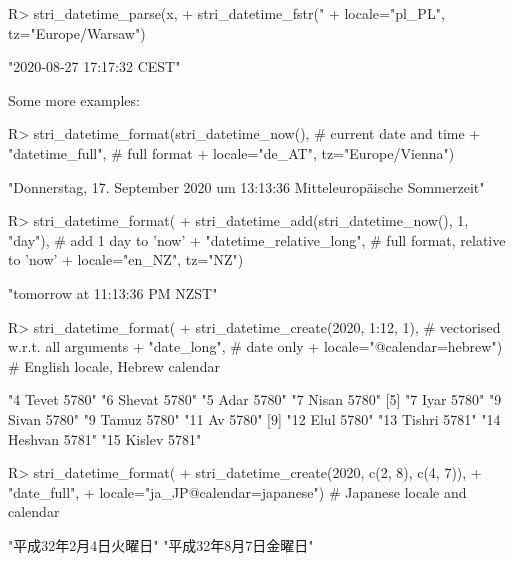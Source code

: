 \documentclass[nojss]{jss}
\begin{document}
\begin{Schunk}
\begin{Sinput}
R> stri_datetime_parse(x,
+    stri_datetime_fstr("%d %B %Y r., godz. %H:%M:%S"),
+    locale="pl_PL", tz="Europe/Warsaw")
\end{Sinput}
\begin{Soutput}
[1] "2020-08-27 17:17:32 CEST"
\end{Soutput}
\end{Schunk}


Some more examples:



\begin{Schunk}
\begin{Sinput}
R> stri_datetime_format(stri_datetime_now(), # current date and time
+    "datetime_full",                        # full format
+    locale="de_AT", tz="Europe/Vienna")
\end{Sinput}
\begin{Soutput}
[1] "Donnerstag, 17. September 2020 um 13:13:36 Mitteleuropäische Sommerzeit"
\end{Soutput}
\begin{Sinput}
R> stri_datetime_format(
+    stri_datetime_add(stri_datetime_now(), 1, "day"), # add 1 day to 'now'
+    "datetime_relative_long",              # full format, relative to 'now'
+    locale="en_NZ", tz="NZ")
\end{Sinput}
\begin{Soutput}
[1] "tomorrow at 11:13:36 PM NZST"
\end{Soutput}
\begin{Sinput}
R> stri_datetime_format(
+    stri_datetime_create(2020, 1:12, 1),   # vectorised w.r.t. all arguments
+    "date_long",                           # date only
+    locale="@calendar=hebrew")             # English locale, Hebrew calendar
\end{Sinput}
\begin{Soutput}
 [1] "4 Tevet 5780"    "6 Shevat 5780"   "5 Adar 5780"     "7 Nisan 5780"
 [5] "7 Iyar 5780"     "9 Sivan 5780"    "9 Tamuz 5780"    "11 Av 5780"
 [9] "12 Elul 5780"    "13 Tishri 5781"  "14 Heshvan 5781" "15 Kislev 5781"
\end{Soutput}
\begin{Sinput}
R> stri_datetime_format(
+    stri_datetime_create(2020, c(2, 8), c(4, 7)),
+    "date_full",
+    locale="ja_JP@calendar=japanese")      # Japanese locale and calendar
\end{Sinput}
\begin{Soutput}
[1] "平成32年2月4日火曜日" "平成32年8月7日金曜日"
\end{Soutput}
\end{Schunk}
\end{document}
